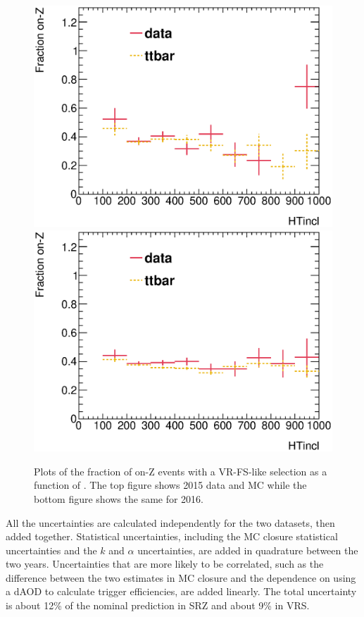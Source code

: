 \begin{centering}
\begin{figure}[bth]
\myfloatalign
\includegraphics[width=.85\linewidth]{figures/fs/frac_vs_ht_2015.eps}
\includegraphics[width=.85\linewidth]{figures/fs/frac_vs_ht_2016.eps}
\caption{Plots of the fraction of on-Z events with a VR-FS-like selection as a function of \HT. The top figure shows 2015 data and \ac{MC} while the bottom figure shows the same for 2016.}
\label{fig:fs_frac_ht}
\end{figure}
\end{centering}

All the uncertainties are calculated independently for the two datasets, then added together. Statistical uncertainties, including the \ac{MC} closure statistical uncertainties and the $k$ and $\alpha$ uncertainties, are added in quadrature between the two years. Uncertainties that are more likely to be correlated, such as the difference between the two estimates in \ac{MC} closure and the dependence on using a dAOD to calculate trigger efficiencies, are added linearly. The total uncertainty is about 12\% of the nominal prediction in SRZ and about 9\% in VRS. 

